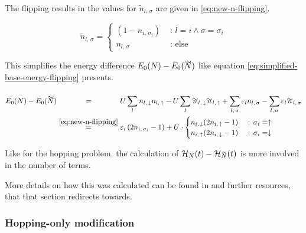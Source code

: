 The flipping results in the values for $\tilde{n}_{l,\,\sigma}$ are given in \autoref{eq:new-n-flipping}.

\begin{equation}
    \label{eq:new-n-flipping}
    \tilde{n}_{l,\,\sigma} = \begin{cases}
        (1 - n_{i,\,\sigma_i})&\text{ : } l = i \land \sigma = \sigma_i   \\
        n_{l,\,\sigma} &\text{ : else}
    \end{cases}
\end{equation}

This simplifies the energy difference $E_0(N)-E_0(\vphantom{N}\smash{\tilde{N}})$ like equation \autoref{eq:simplified-base-energy-flipping} presents.

\begin{equation}
    \label{eq:simplified-base-energy-flipping}
    \begin{split}
        E_0(N)-E_0(\vphantom{N}\smash{\tilde{N}}) 
        &\stackrel{\phantom{\ref{eq:new-n-flipping}}}{=} U\lsum n_{l,\,\down}n_{l,\,\up}-U\lsum \tilde{n}_{l,\,\down}\tilde{n}_{l,\,\up} 
        + \lsum[l,\,\sigma] \epsl n_{l,\,\sigma} - \lsum[l,\,\sigma] \epsl \tilde{n}_{l,\,\sigma}\\
        &\stackrel{\ref{eq:new-n-flipping}}{=} \epsl[i] \left(2 n_{i,\,\sigma_i} - 1\right) +
        U\cdot \begin{cases}
            n_{i,\,\down} (2 n_{i,\,\up} - 1) &\text{ : } \sigma_i = \up   \\
            n_{i,\,\up} (2 n_{i,\,\down} - 1) &\text{ : } \sigma_i = \down 
        \end{cases}
    \end{split}
\end{equation}

Like for the hopping problem, the calculation of $\HNOft - \HNOft[\vphantom{N}\smash{\tilde{N}}]$ is more involved in the number of terms.

More details on how this was calculated can be found in  and further resources, that that section redirects towards.

\subsubsection*{Hopping-only modification}


